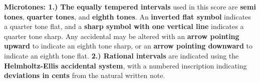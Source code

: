 \documentclass[12pt]{article}
\begin{document}
\begingroup
\textbf{Microtones: 1.) The equally tempered intervals} used in this score are \textbf{semi tones}, \textbf{quarter tones}, and \textbf{eighth tones}. An \textbf{inverted flat symbol} indicates a quarter tone flat, and a \textbf{sharp symbol with one vertical line} indicates a quarter tone sharp. Any accidental may be altered with an \textbf{arrow pointing upward} to indicate an eighth tone sharp, or an \textbf{arrow pointing downward} to indicate an eighth tone flat. \textbf{2.) Rational intervals} are indicated using the \textbf{Helmholtz-Ellis accidental system}, with a numbered inscription indicating \textbf{deviations in cents} from the natural written note. \\
\endgroup
\end{document}
